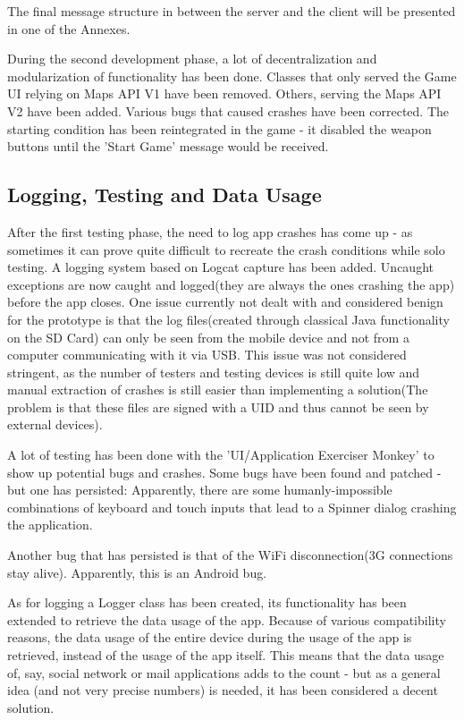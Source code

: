 \documentclass{article}
\begin{document}
The final message structure in between the server and the client will be
presented in one of the Annexes.\newline

During the second development phase, a lot of decentralization and
modularization of functionality has been done. Classes that only served the
Game UI relying on Maps API V1 have been removed. Others, serving the Maps API
V2 have been added. Various bugs that caused crashes have been corrected. The
starting condition has been reintegrated in the game - it disabled the weapon
buttons until the 'Start Game' message would be received.\newline

\subsection{Logging, Testing and Data Usage}
After the first testing phase, the need to log app crashes has come up - as
sometimes it can prove quite difficult to recreate the crash conditions while
solo testing. A logging system based on Logcat capture has been added. Uncaught
exceptions are now caught and logged(they are always the ones crashing the app)
before the app closes. One issue currently not dealt with and considered
benign for the prototype is that the log files(created through classical Java
functionality on the SD Card) can only be seen from the mobile device and not
from a computer communicating with it via USB. This issue was not considered
stringent, as the number of testers and testing devices is still quite low and
manual extraction of crashes is still easier than implementing a solution(The
problem is that these files are signed with a UID and thus cannot be seen by
external devices).\newline

A lot of testing has been done with the 'UI/Application Exerciser Monkey' to
show up potential bugs and crashes. Some bugs have been found and patched - but
one has persisted: Apparently, there are some humanly-impossible combinations of
keyboard and touch inputs that lead to a Spinner dialog crashing the
application. \newline

Another bug that has persisted is that of the WiFi disconnection(3G connections
stay alive). Apparently, this is an Android bug.\newline

As for logging a Logger class has been created, its functionality has been
extended to retrieve the data usage of the app. Because of various compatibility
reasons, the data usage of the entire device during the usage of the app is
retrieved, instead of the usage of the app itself. This means that the data
usage of, say, social network or mail applications adds to the count - but as a
general idea (and not very precise numbers) is needed, it has been considered a
decent solution.
\end{document}
